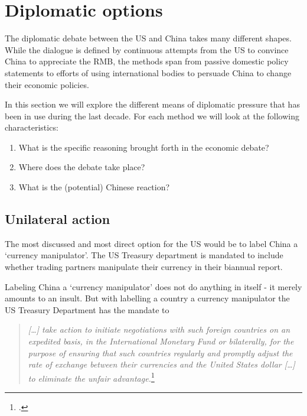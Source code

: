 \section{Diplomatic options}
\label{sec:diplomacy}

The diplomatic debate between the US and China takes many different 
shapes. While the dialogue is defined by continuous attempts from the US 
to convince China to appreciate the RMB, the methods span from passive 
domestic policy statements to efforts of using international bodies to 
persuade China to change their economic policies.

In this section we will explore the different means of diplomatic 
pressure that has been in use during the last decade. For each method we 
will look at the following characteristics:

\begin{enumerate}
	\item{What is the specific reasoning brought 
		forth in the economic debate?}
	\item{Where does the debate take 
		place?}
	\item{What is the (potential) Chinese reaction?}
\end{enumerate}



\subsection{Unilateral action}

The most discussed and most direct option for the US would be to label 
China a `currency manipulator'. The US Treasury department is mandated 
to include whether trading partners manipulate their currency in their 
biannual report.  

Labeling China a `currency manipulator' does not do anything in itself - 
it merely amounts to an insult. But with labelling a country a currency 
manipulator the US Treasury Department has the mandate to
\begin{quotation}
\emph{[\dots] take action to initiate negotiations with such foreign 
	countries on an expedited basis, in the International Monetary Fund 
	or bilaterally, for the purpose of ensuring that such countries 
	regularly and promptly adjust the rate of exchange between their 
	currencies and the United States dollar [\dots] to eliminate the 
unfair advantage.}\footnote{\cite{TradeAct1988}.}
\end{quotation}

